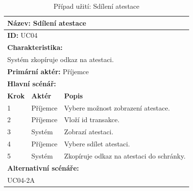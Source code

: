 \vspace{-1mm} %
\renewcommand{\arraystretch}{1.5} %
\begin{table}[h]
	\centering
	\begin{tabular}{|p{1cm}|p{2cm}|p{10cm}|}
		\hline
		\multicolumn{3}{|l|}{\textbf{Název:} Sdílení atestace} \\ \hline
		\multicolumn{3}{|l|}{\textbf{ID:} UC04} \\ \hline
		\multicolumn{3}{|l|}{\textbf{Charakteristika:}} \\ \hline
		\multicolumn{3}{|l|}{Systém zkopíruje odkaz na atestaci.} \\ \hline
		\multicolumn{3}{|l|}{\textbf{Primární aktér:} Příjemce} \\ \hline
		\multicolumn{3}{|l|}{\textbf{Hlavní scénář:}} \\ \hline
		\textbf{Krok} & \textbf{Aktér} & \textbf{Popis} \\ \hline
		1 & Příjemce  & Vybere možnost zobrazení atestace. \\ \hline
		2 & Příjemce  & Vloží id transakce. \\ \hline
		3 & Systém    & Zobrazí atestaci. \\ \hline
		4 & Příjemce  & Vybere sdílet atestaci. \\ \hline
		5 & Systém    & Zkopíruje odkaz na atestaci do schránky. \\ \hline
		
		\multicolumn{3}{|l|}{\textbf{Alternativní scénáře:}} \\ \hline
		\multicolumn{3}{|l|}{UC04-2A} \\ \hline
		
	\end{tabular}
	\vspace{10pt} %
	\caption{Případ užití: Sdílení atestace}
	\label{tab:usecase-share-attestation}
\end{table}
\renewcommand{\arraystretch}{1} %



